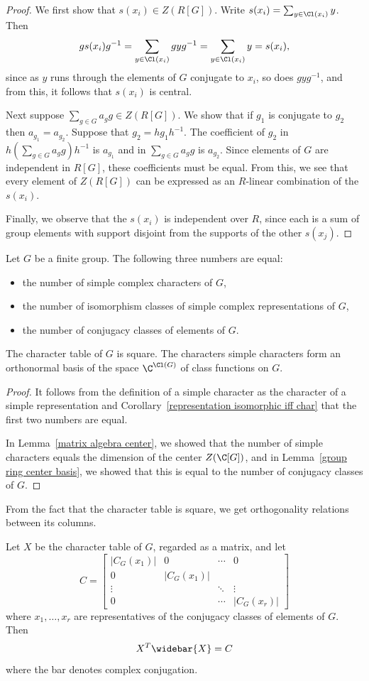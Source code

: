 \begin{proof}
We first show that $s(x_i)\in Z(R[G])$. Write $s(x_i)=\sum_{y\in\Cl(x_i)}y$. Then
\[gs(x_i)g^{-1}=\sum_{y\in\Cl(x_i)}gyg^{-1}=\sum_{y\in\Cl(x_i)}y=s(x_i),\]
since as $y$ runs through the elements of $G$ conjugate to $x_i$, so does $gyg^{-1}$, and from this, it follows that $s(x_i)$ is central.\par
Next suppose $\sum_{g\in G}a_gg\in Z(R[G])$. We show that if $g_1$ is conjugate to $g_2$ then $a_{g_1}=a_{g_2}$. Suppose that $g_2=hg_1h^{-1}$. The coefficient of $g_2$ in $h(\sum_{g\in G}a_gg)h^{-1}$ is $a_{g_1}$ and in
$\sum_{g\in G}a_gg$ is $a_{g_2}$. Since elements of $G$ are independent in $R[G]$, these coefficients must be equal. From this, we see that every element of $Z(R[G])$ can be expressed as an $R$-linear combination of the $s(x_i)$.\par
Finally, we observe that the $s(x_i)$ is independent over $R$, since each is a sum of group elements with support disjoint from the supports of the other $s(x_j)$.
\end{proof}
\begin{theorem}\label{representation number}
Let $G$ be a finite group. The following three numbers are equal:
\begin{itemize}
\item the number of simple complex characters of $G$,
\item the number of isomorphism classes of simple complex representations of $G$,
\item the number of conjugacy classes of elements of $G$.
\end{itemize}
The character table of $G$ is square. The characters simple characters form an orthonormal basis of the space $\C^{\Cl(G)}$ of class functions on $G$.
\end{theorem}
\begin{proof}
It follows from the definition of a simple character as the character of a simple representation and Corollary~\ref{representation isomorphic iff char} that the first two numbers are equal.\par
In Lemma~\ref{matrix algebra center}, we showed that the number of simple characters equals the dimension of the center $Z(\C[G])$, and in Lemma~\ref{group ring center basis}, we showed that this is equal to the number of conjugacy classes of $G$.
\end{proof}
From the fact that the character table is square, we get orthogonality relations between its columns.
\begin{corollary}
Let $X$ be the character table of $G$, regarded as a matrix, and let
\[C=\begin{bmatrix}
|C_G(x_1)|&0&\cdots&0\\
0&|C_G(x_1)|&&\\
\vdots&&\ddots&\vdots\\
0&&\cdots&|C_G(x_r)|
\end{bmatrix}\]
where $x_1,\dots,x_r$ are representatives of the conjugacy classes of elements of $G$. Then
\[X^T\widebar{X}=C\]
where the bar denotes complex conjugation.
\end{corollary}
